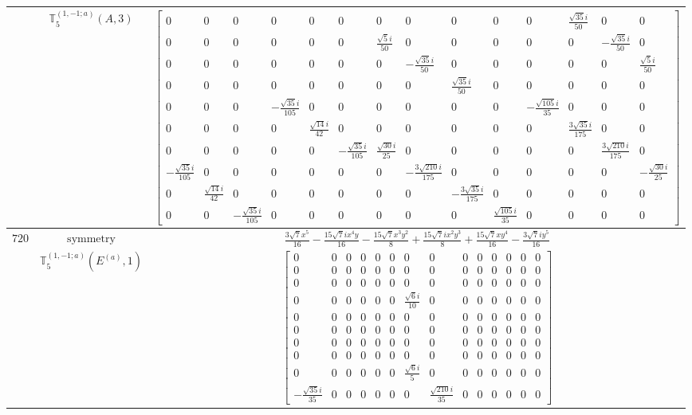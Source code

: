 \documentclass[fleqn,8pt,landscape]{jsarticle}
\begin{document}
\begin{longtable}{ccc}
$  $ & $ \mathbb{T}_{5}^{(1,-1;a)}(A,3) $ & $ \begin{bmatrix} 0 & 0 & 0 & 0 & 0 & 0 & 0 & 0 & 0 & 0 & 0 & \frac{\sqrt{35} i}{50} & 0 & 0 \\ 0 & 0 & 0 & 0 & 0 & 0 & \frac{\sqrt{5} i}{50} & 0 & 0 & 0 & 0 & 0 & - \frac{\sqrt{35} i}{50} & 0 \\ 0 & 0 & 0 & 0 & 0 & 0 & 0 & - \frac{\sqrt{35} i}{50} & 0 & 0 & 0 & 0 & 0 & \frac{\sqrt{5} i}{50} \\ 0 & 0 & 0 & 0 & 0 & 0 & 0 & 0 & \frac{\sqrt{35} i}{50} & 0 & 0 & 0 & 0 & 0 \\ 0 & 0 & 0 & - \frac{\sqrt{35} i}{105} & 0 & 0 & 0 & 0 & 0 & 0 & - \frac{\sqrt{105} i}{35} & 0 & 0 & 0 \\ 0 & 0 & 0 & 0 & \frac{\sqrt{14} i}{42} & 0 & 0 & 0 & 0 & 0 & 0 & \frac{3 \sqrt{35} i}{175} & 0 & 0 \\ 0 & 0 & 0 & 0 & 0 & - \frac{\sqrt{35} i}{105} & \frac{\sqrt{30} i}{25} & 0 & 0 & 0 & 0 & 0 & \frac{3 \sqrt{210} i}{175} & 0 \\ - \frac{\sqrt{35} i}{105} & 0 & 0 & 0 & 0 & 0 & 0 & - \frac{3 \sqrt{210} i}{175} & 0 & 0 & 0 & 0 & 0 & - \frac{\sqrt{30} i}{25} \\ 0 & \frac{\sqrt{14} i}{42} & 0 & 0 & 0 & 0 & 0 & 0 & - \frac{3 \sqrt{35} i}{175} & 0 & 0 & 0 & 0 & 0 \\ 0 & 0 & - \frac{\sqrt{35} i}{105} & 0 & 0 & 0 & 0 & 0 & 0 & \frac{\sqrt{105} i}{35} & 0 & 0 & 0 & 0 \end{bmatrix} $ \\ \hline
$ 720 $ & $ \text{symmetry} $ & $ \frac{3 \sqrt{7} x^{5}}{16} - \frac{15 \sqrt{7} i x^{4} y}{16} - \frac{15 \sqrt{7} x^{3} y^{2}}{8} + \frac{15 \sqrt{7} i x^{2} y^{3}}{8} + \frac{15 \sqrt{7} x y^{4}}{16} - \frac{3 \sqrt{7} i y^{5}}{16} $ \\
$  $ & $ \mathbb{T}_{5}^{(1,-1;a)}(E^{(a)},1) $ & $ \begin{bmatrix} 0 & 0 & 0 & 0 & 0 & 0 & 0 & 0 & 0 & 0 & 0 & 0 & 0 & 0 \\ 0 & 0 & 0 & 0 & 0 & 0 & 0 & 0 & 0 & 0 & 0 & 0 & 0 & 0 \\ 0 & 0 & 0 & 0 & 0 & 0 & 0 & 0 & 0 & 0 & 0 & 0 & 0 & 0 \\ 0 & 0 & 0 & 0 & 0 & 0 & \frac{\sqrt{6} i}{10} & 0 & 0 & 0 & 0 & 0 & 0 & 0 \\ 0 & 0 & 0 & 0 & 0 & 0 & 0 & 0 & 0 & 0 & 0 & 0 & 0 & 0 \\ 0 & 0 & 0 & 0 & 0 & 0 & 0 & 0 & 0 & 0 & 0 & 0 & 0 & 0 \\ 0 & 0 & 0 & 0 & 0 & 0 & 0 & 0 & 0 & 0 & 0 & 0 & 0 & 0 \\ 0 & 0 & 0 & 0 & 0 & 0 & 0 & 0 & 0 & 0 & 0 & 0 & 0 & 0 \\ 0 & 0 & 0 & 0 & 0 & 0 & \frac{\sqrt{6} i}{5} & 0 & 0 & 0 & 0 & 0 & 0 & 0 \\ - \frac{\sqrt{35} i}{35} & 0 & 0 & 0 & 0 & 0 & 0 & \frac{\sqrt{210} i}{35} & 0 & 0 & 0 & 0 & 0 & 0 \end{bmatrix} $ \\ \hline

\end{longtable}
\end{document}
